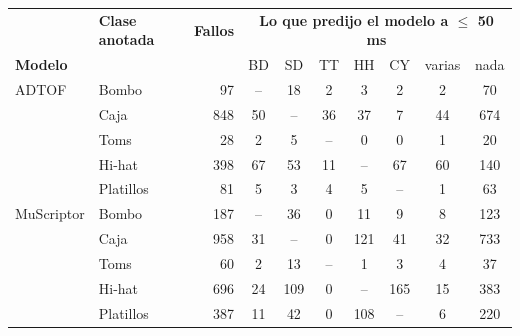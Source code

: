 \begin{tabular}{llr|ccccccc}
\toprule
& \textbf{Clase anotada} & \textbf{Fallos} & \multicolumn{7}{c}{\textbf{Lo que predijo el modelo a $\le$ 50 ms}} \\
\textbf{Modelo} & & & BD & SD & TT & HH & CY & varias & nada \\
\midrule
ADTOF & Bombo & 97 & -- & 18 & 2 & 3 & 2 & 2 & 70 \\
 & Caja & 848 & 50 & -- & 36 & 37 & 7 & 44 & 674 \\
 & Toms & 28 & 2 & 5 & -- & 0 & 0 & 1 & 20 \\
 & Hi-hat & 398 & 67 & 53 & 11 & -- & 67 & 60 & 140 \\
 & Platillos & 81 & 5 & 3 & 4 & 5 & -- & 1 & 63 \\
\midrule
MuScriptor & Bombo & 187 & -- & 36 & 0 & 11 & 9 & 8 & 123 \\
 & Caja & 958 & 31 & -- & 0 & 121 & 41 & 32 & 733 \\
 & Toms & 60 & 2 & 13 & -- & 1 & 3 & 4 & 37 \\
 & Hi-hat & 696 & 24 & 109 & 0 & -- & 165 & 15 & 383 \\
 & Platillos & 387 & 11 & 42 & 0 & 108 & -- & 6 & 220 \\
\bottomrule
\end{tabular}
